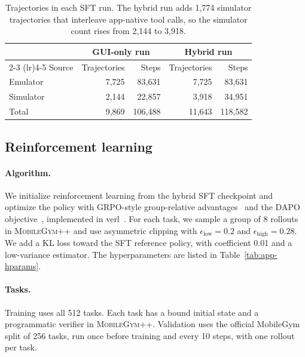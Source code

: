\begin{table}[t]
\centering
\small
\caption{Trajectories in each SFT run. The hybrid run adds 1,774 simulator trajectories that interleave app-native tool calls, so the simulator count rises from 2,144 to 3,918.}
\label{tab:app-sft-data}
\setlength{\tabcolsep}{5pt}
\begin{tabular}{lrrrr}
\toprule
 & \multicolumn{2}{c}{GUI-only run} & \multicolumn{2}{c}{Hybrid run} \\
\cmidrule(lr){2-3} \cmidrule(lr){4-5}
Source & Trajectories & Steps & Trajectories & Steps \\
\midrule
Emulator & 7,725 & 83,631 & 7,725 & 83,631 \\
Simulator & 2,144 & 22,857 & 3,918 & 34,951 \\
\midrule
Total & 9,869 & 106,488 & 11,643 & 118,582 \\
\bottomrule
\end{tabular}
\end{table}


\subsection{Reinforcement learning}
\label{app:rl}

\paragraph{Algorithm.}
We initialize reinforcement learning from the hybrid SFT checkpoint and optimize the policy with GRPO-style group-relative advantages~\citep{shao2024deepseekmath} and the DAPO objective~\citep{yu2026dapo}, implemented in verl~\citep{sheng2025hybridflow}. For each task, we sample a group of 8 rollouts in \textsc{MobileGym++} and use asymmetric clipping with $\epsilon_{\text{low}}{=}0.2$ and $\epsilon_{\text{high}}{=}0.28$. We add a KL loss toward the SFT reference policy, with coefficient 0.01 and a low-variance estimator. The hyperparameters are listed in Table~\ref{tab:app-hparams}.

\paragraph{Tasks.}
Training uses all 512 tasks. Each task has a bound initial state and a programmatic verifier in \textsc{MobileGym++}. Validation uses the official MobileGym split of 256 tasks, run once before training and every 10 steps, with one rollout per task.

